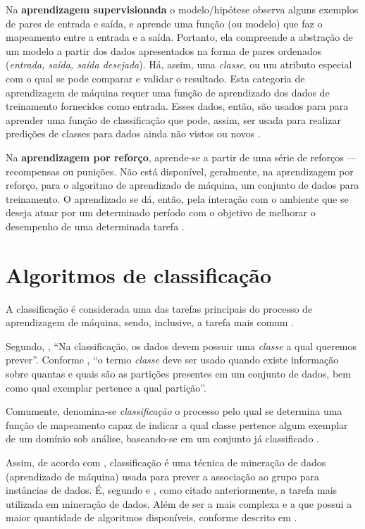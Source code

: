 Na \textbf{aprendizagem supervisionada} o modelo/hipótese observa alguns exemplos de pares de entrada e saída, e aprende uma função (ou modelo) que faz o mapeamento entre a entrada e a saída. Portanto, ela compreende a abstração de um modelo a partir dos dados apresentados na forma de pares ordenados (\textit{entrada, saída, saída desejada}). Há, assim, uma \textit{classe}, ou um atributo especial com o qual se pode comparar e validar o resultado. Esta categoria de aprendizagem de máquina requer uma função de aprendizado dos dados de treinamento fornecidos como entrada. Esses dados, então, são usados para para aprender uma função de classificação que pode, assim, ser usada para realizar predições de classes para dados ainda não vistos ou novos \cite{Norvig2013} \cite{luger_inteligencia_2015} \cite{baeza-yates_recuperacao_2013}.

Na \textbf{aprendizagem por reforço}, aprende-se a partir de uma série de reforços --- recompensas ou punições. Não está disponível, geralmente, na aprendizagem por reforço, para o algoritmo de aprendizado de máquina, um conjunto de dados para treinamento. O aprendizado se dá, então, pela interação com o ambiente que se deseja atuar por um determinado período com o objetivo de melhorar o desempenho de uma determinada tarefa \cite{Norvig2013} \cite{aprenda_mineracao_fernando_amaral16} \cite{silva_restaurante_2019}.

\section{Algoritmos de classificação}
A classificação é considerada uma das tarefas principais do processo de aprendizagem de máquina, sendo, inclusive, a tarefa mais comum \cite{amaral_introducao_2018} \cite{fayyad1996}.

Segundo, , ``Na classificação, os dados devem possuir uma \textit{classe} a qual queremos prever''. Conforme , ``o termo \textit{classe} deve ser usado quando existe informação sobre quantas e quais são as partições presentes em um conjunto de dados, bem como qual exemplar pertence a qual partição''.

Comumente, denomina-se \textit{classificação} o processo pelo qual se determina uma função de mapeamento capaz de indicar a qual classe pertence algum exemplar de um domínio sob análise, baseando-se em um conjunto já classificado \cite{Boscarioli2017}.

Assim, de acordo com , classificação é uma técnica de mineração de dados (aprendizado de máquina) usada para prever a associação ao grupo para instâncias de dados. É, segundo  e , como citado anteriormente, a tarefa mais utilizada em mineração de dados. Além de ser a mais complexa e a que possui a maior quantidade de algoritmos disponíveis, conforme descrito em .

